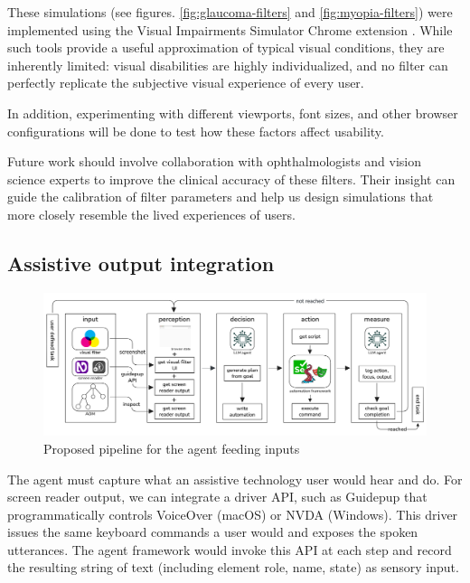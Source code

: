 These simulations (see figures. \ref{fig:glaucoma-filters} and \ref{fig:myopia-filters}) were implemented using the Visual Impairments Simulator Chrome extension \cite{visual_impairments_simulator}. While such tools provide a useful approximation of typical visual conditions, they are inherently limited: visual disabilities are highly individualized, and no filter can perfectly replicate the subjective visual experience of every user.

In addition, experimenting with different viewports, font sizes, and other browser configurations\cite{chiou2024automatically} will be done to test how these factors affect usability.

Future work should involve collaboration with ophthalmologists and vision science experts to improve the clinical accuracy of these filters. Their insight can guide the calibration of filter parameters and help us design simulations that more closely resemble the lived experiences of users.

\subsection{Assistive output integration}

\begin{figure}
    \centering
    \includegraphics[width=1\linewidth]{imgs/flow.png}
    \caption{Proposed pipeline for the agent feeding inputs}
    \vspace{-13pt}
\label{fig:pipeline}
\end{figure}


The agent must capture what an assistive technology user would hear and do. For screen reader output, we can integrate a driver API, such as Guidepup\cite{guidepup2025} that programmatically controls VoiceOver (macOS)\cite{voiceover2024} or NVDA (Windows)\cite{nvda2024}.
This driver issues the same keyboard commands a user would and exposes the spoken utterances\cite{guidepup2025}. The agent framework would invoke this API at each step and record the resulting string of text (including element role, name, state) as sensory input.

